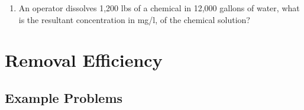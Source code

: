 \begin{enumerate}
\item An operator dissolves 1,200 lbs of a chemical in 12,000 gallons of water, what is the resultant concentration in mg/l, of the chemical solution?\\
\end{enumerate}

\newpage
\section{Removal Efficiency}

\subsection{Example Problems} 

